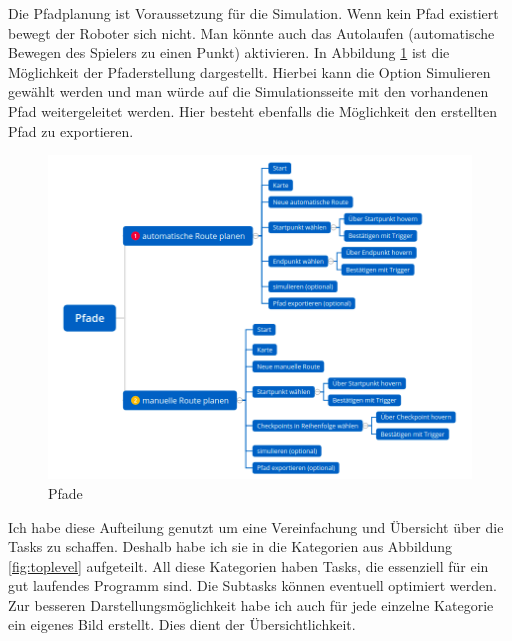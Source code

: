 \documentclass{TUBAFarbeiten}
\begin{document}
Die Pfadplanung ist Voraussetzung für die Simulation. Wenn kein Pfad existiert bewegt der Roboter sich nicht. Man könnte auch das Autolaufen (automatische Bewegen des Spielers zu einen Punkt) aktivieren. In Abbildung \ref{fig:Pfad} ist die Möglichkeit der Pfaderstellung dargestellt. Hierbei kann die Option Simulieren gewählt werden und man würde auf die Simulationsseite mit den vorhandenen Pfad weitergeleitet werden. Hier besteht ebenfalls die Möglichkeit den erstellten Pfad zu exportieren.\\

\begin{figure}
	\centering
	\includegraphics[width=\linewidth]{pfad.png}
	\caption{Pfade}
	\label{fig:Pfad}
\end{figure}

Ich habe diese Aufteilung genutzt um eine Vereinfachung und Übersicht über die Tasks zu schaffen. Deshalb habe ich sie in die Kategorien aus Abbildung \ref{fig:toplevel} aufgeteilt. All diese Kategorien haben Tasks, die essenziell für ein gut laufendes Programm sind. Die Subtasks können eventuell optimiert werden. Zur besseren Darstellungsmöglichkeit habe ich auch für jede einzelne Kategorie ein eigenes Bild erstellt. Dies dient der Übersichtlichkeit.
\newpage
\end{document}
